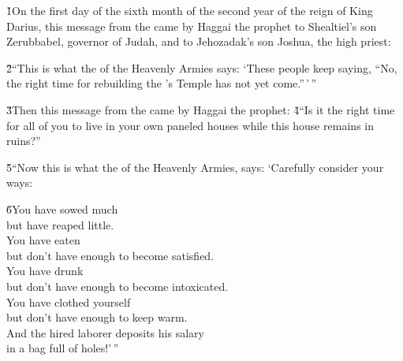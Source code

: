 


\v{1}On the first day of the sixth month of the second year of the reign of King Darius, this message from the  came by Haggai the prophet to Shealtiel's son Zerubbabel, governor of Judah, and to Jehozadak's son Joshua, the high priest:

\v{2}``This is what the  of the Heavenly Armies says: `These people keep saying, ``No, the right time for rebuilding the 's Temple has not yet come.''\,'\,''

\v{3}Then this message from the  came by Haggai the prophet: \v{4}``Is it the right time for all of you to live in your own paneled houses while this house remains in ruins?''

\v{5}``Now this is what the  of the Heavenly Armies, says: `Carefully consider your ways:

\begin{poetry}
\poeml \v{6}You have sowed much \\
\poemll    but have reaped little. \\
\poeml You have eaten \\
\poemll    but don't have enough to become satisfied. \\
\poeml You have drunk \\
\poemll    but don't have enough to become intoxicated. \\
\poeml You have clothed yourself \\
\poemll    but don't have enough to keep warm. \\
\poeml And the hired laborer deposits his salary \\
\poemll    in a bag full of holes!'\,''
\end{poetry}

